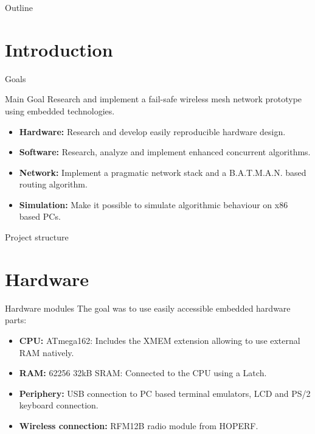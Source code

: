 \begin{frame}
\titlepage
\end{frame}

\begin{frame}{Outline}
\tableofcontents
\end{frame}

\section{Introduction}
\begin{frame}{Goals}

\begin{exampleblock}{Main Goal}
Research and implement a fail-safe wireless mesh network prototype using embedded technologies.
\end{exampleblock}

\begin{itemize}
    \item \textbf{Hardware:} Research and develop easily reproducible hardware design.
    \item \textbf{Software:} Research, analyze and implement enhanced concurrent algorithms.
    \item \textbf{Network:} Implement a pragmatic network stack and a B.A.T.M.A.N. based routing algorithm.
    \item \textbf{Simulation:} Make it possible to simulate algorithmic behaviour on x86 based PCs.
\end{itemize} 
\end{frame}

\begin{frame}{Project structure}
\begin{center}
\scalebox{0.56} {
}
\end{center}
\end{frame}

\section{Hardware}
\begin{frame}{Hardware modules}
The goal was to use easily accessible embedded hardware parts:

\begin{itemize}
    \item \textbf{CPU:} ATmega162: Includes the XMEM extension allowing to use external RAM natively.
    \item \textbf{RAM:} 62256 32kB SRAM: Connected to the CPU using a Latch.
    \item \textbf{Periphery:} USB connection to PC based terminal emulators, LCD and PS/2 keyboard connection.
    \item \textbf{Wireless connection:} RFM12B radio module from HOPERF.
\end{itemize} 
\end{frame}


